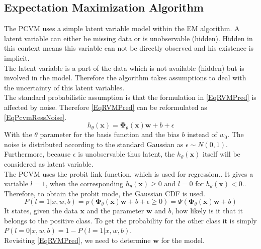 \subsection{Expectation Maximization Algorithm}\label{PcSecEM}
The \acs{PCVM} uses a simple latent variable model within the \acs{EM} algorithm.\cite{Chen.2009}
A latent variable can either be missing data or is unobservable (hidden).\cite[p. 276-277]{TrevorHastie.2009}\cite[p. 84]{Bishop.2009}
Hidden in this context means this variable can not be directly observed and his existence is implicit.\cite{Borsboom.}\\
The latent variable is a part of the data which is not available (hidden) but is involved in the model.
Therefore the algorithm takes assumptions to deal with the uncertainty of this latent variables.\\
The standard probabilistic assumption is that the formulation in \eqref{EqRVMPred} is affected by noise.
Therefore \eqref{EqRVMPred} can be reformulated as \eqref{EqPcvmRessNoise}.\cite{Chen.2009}
\begin{equation}\label{EqPcvmRessNoise}
h_\theta (\mathbf{x}) = \boldsymbol{\Phi}_\theta(\mathbf{x}) \mathbf{w} + b +  \epsilon
\end{equation} 
With the $\theta$ parameter for the basis function and the bias $b$ instead of $w_0$.
The noise is distributed according to the standard Gaussian as $\epsilon \sim N(0,1)$.
Furthermore, because $\epsilon$ is unobservable thus latent, the $h_\theta(\mathbf{x})$ itself will be considered as latent variable.\cite{Chen.2009}\\
The \acs{PCVM} uses the probit link function, which is used for regression.\cite{Albert.1993}. It gives a variable $l = 1$, when the corresponding $h_\theta (\mathbf{x}) \ge 0$ and $l = 0$ for $h_\theta (\mathbf{x}) < 0$.\cite{Chen.2009}.
Therefore, to obtain the probit mode, the Gaussian \acs{CDF} is used.
\begin{equation}\label{EqProbitLinkProb}
P(l=1\vert x,w,b) = p(\boldsymbol{\Phi}_\theta(\mathbf{x})\mathbf{w} + b + \epsilon \ge 0) = \Psi(\boldsymbol{\Phi}_\theta(\mathbf{x})\mathbf{w} +b)
\end{equation}
It states, given the data $\mathbf{x}$ and the parameter $\mathbf{w}$ and $b$, how likely is it that it belongs to the positive class.
To get the probability for the other class it is simply $P(l=0 \vert x,w,b) = 1-P(l=1\vert x,w,b)$.\cite{Chen.2009}\\
Revisiting \eqref{EqRVMPred}, we need to determine $\mathbf{w}$ for the model.

